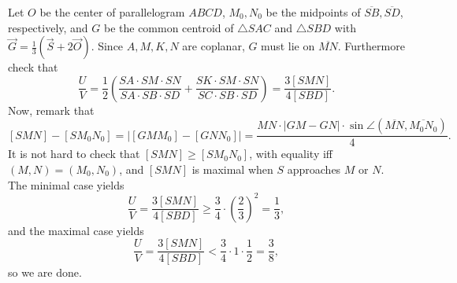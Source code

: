 Let $O$ be the center of parallelogram $ABCD$, $M_0,N_0$ be the midpoints of $\overline{SB},\overline{SD}$, respectively, and $G$ be the common centroid of $\triangle SAC$ and $\triangle SBD$ with $\vec G=\tfrac13\left(\vec S+2\vec O\right)$. Since $A,M,K,N$ are coplanar, $G$ must lie on $\overline{MN}$. Furthermore check that \[\frac UV=\frac12\left(\frac{SA\cdot SM\cdot SN}{SA\cdot SB\cdot SD}+\frac{SK\cdot SM\cdot SN}{SC\cdot SB\cdot SD}\right)=\frac{3[SMN]}{4[SBD]}.\]
Now, remark that \[[SMN]-[SM_0N_0]=\Big|[GMM_0]-[GNN_0]\Big|=\frac{MN\cdot |GM-GN|\cdot\sin\angle(\overline{MN},\overline{M_0N_0})}4.\]
It is not hard to check that $[SMN]\ge [SM_0N_0]$, with equality iff $(M,N)=(M_0,N_0)$, and $[SMN]$ is maximal when $S$ approaches $M$ or $N$. The minimal case yields \[\frac UV=\frac{3[SMN]}{4[SBD]}\ge\frac34\cdot\left(\frac23\right)^2=\frac13,\]
and the maximal case yields\[\frac UV=\frac{3[SMN]}{4[SBD]}<\frac34\cdot 1\cdot\frac12=\frac38,\]
so we are done. 

